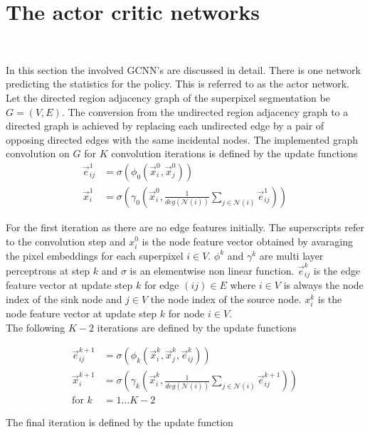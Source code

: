\section{The actor critic networks}~\label{sec:sag_gcn}

In this section the involved GCNN's are discussed in detail. There is one network predicting the statistics for the policy. This is referred to as the actor network. Let the directed region adjacency graph of the superpixel segmentation be $G=(V,E)$. The conversion from the undirected region adjacency graph to a directed graph is achieved by replacing each undirected edge by a pair of opposing directed edges with the same incidental nodes. The implemented graph convolution on $G$ for $K$ convolution iterations is defined by the update functions\\

\begin{align}
\vec{e}_{ij}^{1} &= \sigma \left( \phi_0 \left(\vec{x}_i^{0}, \vec{x}_j^{0} \right)\right)\\
\vec{x}_i^1 &= \sigma \left( \gamma_0 \left(\vec{x}_i^0, \frac{1}{deg(\mathcal{N}(i))} \sum_{j \in \mathcal{N}(i)}  \vec{e}_{ij}^1 \right)\right)
\end{align}

For the first iteration as there are no edge features initially. The superscripts refer to the convolution step and $x_i^0$ is the node feature vector obtained by avaraging the pixel embeddings for each superpixel $i \in V$. 
$\phi^k$ and $\gamma^k$ are multi layer perceptrons at step $k$ and $\sigma$ is an elementwise non linear function.
$\vec{e}_{ij}^{k}$ is the edge feature vector at update step $k$ for edge $(ij) \in E$ where $i \in V$ is always the node index of the sink node and $j \in V$ the node index of the source node. $x_i^k$ is the node feature vector at update step $k$ for node $i \in V$.\\
The following $K-2$ iterations are defined by the update functions

\begin{align}
\vec{e}_{ij}^{k+1} &= \sigma \left( \phi_k \left(\vec{x}_i^k, \vec{x}_j^k, \vec{e}_{ij}^k \right)\right)\\
\vec{x}_i^{k+1} &= \sigma \left( \gamma_k \left(\vec{x}_i^k, \frac{1}{deg(\mathcal{N}(i))} \sum_{j \in \mathcal{N}(i)}  \vec{e}_{ij}^{k+1} \right) \right)\\
\text{for }k&=1...K-2
\end{align}

The final iteration is defined by the update function

